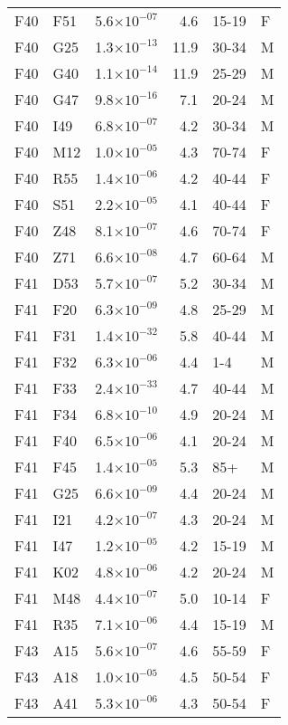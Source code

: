 \begin{longtable}{lllrll}
   F40 & F51 & 5.6$\times10^{-07}$ & 4.6 & 15-19 & F \\ 
   F40 & G25 & 1.3$\times10^{-13}$ & 11.9 & 30-34 & M \\ 
   F40 & G40 & 1.1$\times10^{-14}$ & 11.9 & 25-29 & M \\ 
   F40 & G47 & 9.8$\times10^{-16}$ & 7.1 & 20-24 & M \\ 
   F40 & I49 & 6.8$\times10^{-07}$ & 4.2 & 30-34 & M \\ 
   F40 & M12 & 1.0$\times10^{-05}$ & 4.3 & 70-74 & F \\ 
   F40 & R55 & 1.4$\times10^{-06}$ & 4.2 & 40-44 & F \\ 
   F40 & S51 & 2.2$\times10^{-05}$ & 4.1 & 40-44 & F \\ 
   F40 & Z48 & 8.1$\times10^{-07}$ & 4.6 & 70-74 & F \\ 
   F40 & Z71 & 6.6$\times10^{-08}$ & 4.7 & 60-64 & M \\ 
   F41 & D53 & 5.7$\times10^{-07}$ & 5.2 & 30-34 & M \\ 
   F41 & F20 & 6.3$\times10^{-09}$ & 4.8 & 25-29 & M \\ 
   F41 & F31 & 1.4$\times10^{-32}$ & 5.8 & 40-44 & M \\ 
   F41 & F32 & 6.3$\times10^{-06}$ & 4.4 & 1-4 & M \\ 
   F41 & F33 & 2.4$\times10^{-33}$ & 4.7 & 40-44 & M \\ 
   F41 & F34 & 6.8$\times10^{-10}$ & 4.9 & 20-24 & M \\ 
   F41 & F40 & 6.5$\times10^{-06}$ & 4.1 & 20-24 & M \\ 
   F41 & F45 & 1.4$\times10^{-05}$ & 5.3 & 85+ & M \\ 
   F41 & G25 & 6.6$\times10^{-09}$ & 4.4 & 20-24 & M \\ 
   F41 & I21 & 4.2$\times10^{-07}$ & 4.3 & 20-24 & M \\ 
   F41 & I47 & 1.2$\times10^{-05}$ & 4.2 & 15-19 & M \\ 
   F41 & K02 & 4.8$\times10^{-06}$ & 4.2 & 20-24 & M \\ 
   F41 & M48 & 4.4$\times10^{-07}$ & 5.0 & 10-14 & F \\ 
   F41 & R35 & 7.1$\times10^{-06}$ & 4.4 & 15-19 & M \\ 
   F43 & A15 & 5.6$\times10^{-07}$ & 4.6 & 55-59 & F \\ 
   F43 & A18 & 1.0$\times10^{-05}$ & 4.5 & 50-54 & F \\ 
   F43 & A41 & 5.3$\times10^{-06}$ & 4.3 & 50-54 & F \\ 

\end{longtable}
